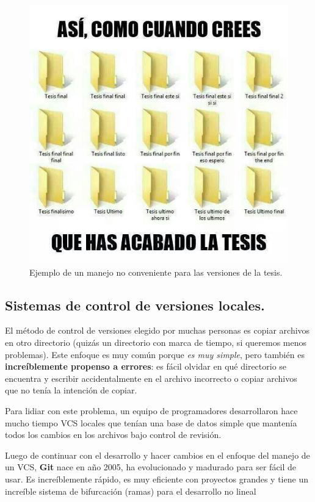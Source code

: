 \begin{figure}[H]
    \centering
    \includegraphics[scale=0.5]{Imagenes/meme_tesis.jpeg}
    \caption{Ejemplo de un manejo no conveniente para las versiones de la tesis.}
\end{figure}

\subsection{Sistemas de control de versiones locales.}

El método de control de versiones elegido por muchas personas es copiar archivos en otro directorio (quizás un directorio con marca de tiempo, si queremos menos problemas). Este enfoque es muy común porque \textit{es muy simple}, pero también es \textbf{increíblemente propenso a errores}: es fácil olvidar en qué directorio se encuentra y escribir accidentalmente en el archivo incorrecto o copiar archivos que no tenía la intención de copiar.
\par
Para lidiar con este problema, un equipo de programadores desarrollaron hace mucho tiempo VCS locales que tenían una base de datos simple que mantenía todos los cambios en los archivos bajo control de revisión.
\par
Luego de continuar con el desarrollo y hacer cambios en el enfoque del manejo de un VCS, \textbf{Git} nace en año 2005, ha evolucionado y madurado para ser fácil de usar. Es increíblemente rápido, es muy eficiente con proyectos grandes y tiene un increíble sistema de bifurcación (ramas) para el desarrollo no lineal


